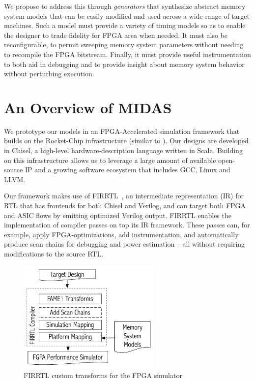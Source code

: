 We propose to address this through \emph{generators} that synthesize abstract
memory system models that can be easily modified and used across a wide range
of target machines. Such a model must provide a variety of timing models so as
to enable the designer to trade fidelity for FPGA area when needed. It must
also be reconfigurable, to permit sweeping memory system parameters without
needing to recompile the FPGA bitstream. Finally, it must provide useful
instrumentation to both aid in debugging and to provide insight about memory
system behavior without perturbing execution.

\clearpage
\section{An Overview of MIDAS}

We prototype our models in an FPGA-Accelerated simulation framework that builds on
the Rocket-Chip \cite{rocketchip} infrastructure (similar to
\cite{strober}). Our designs are developed in Chisel, a high-level
hardware-description language written in Scala. Building on this infrastructure
allows us to leverage a large amount of available open-source IP and a growing
software ecosystem that includes GCC, Linux and LLVM.

Our framework makes use of FIRRTL~\cite{firrtl}, an intermediate representation
(IR) for RTL that has frontends for both Chisel and Verilog, and can target
both FPGA and ASIC flows by emitting optimized Verilog output. FIRRTL enables
the implementation of compiler passes on top its IR framework. These passes
can, for example, apply FPGA-optimizations, add instrumentation, and
automatically produce scan chains for debugging and power
estimation\cite{strober} -- all without requiring modifications to the source
RTL.

\begin{figure}
	\centering
	\includegraphics[width=7cm]{figures/firrtl.pdf}
	\caption{FIRRTL custom transforms for the FPGA simulator}
	\label{fig:firrtl}
\end{figure}


